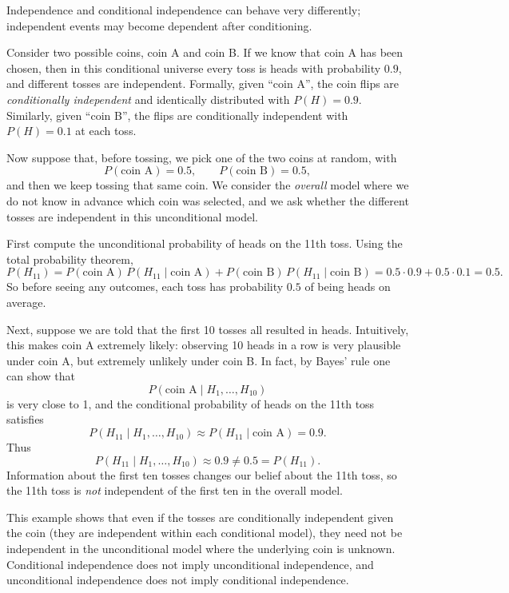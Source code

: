 Independence and conditional independence can behave very differently; independent events may become dependent after conditioning.

Consider two possible coins, coin A and coin B. If we know that coin A has been chosen, then in this conditional universe every toss is heads with probability \(0.9\), and different tosses are independent. Formally, given “coin A”, the coin flips are \textit{conditionally independent} and identically distributed with \(P(H) = 0.9\). Similarly, given “coin B”, the flips are conditionally independent with \(P(H) = 0.1\) at each toss.

Now suppose that, before tossing, we pick one of the two coins at random, with
\[
P(\text{coin A}) = 0.5, \qquad P(\text{coin B}) = 0.5,
\]
and then we keep tossing that same coin. We consider the \textit{overall} model where we do not know in advance which coin was selected, and we ask whether the different tosses are independent in this unconditional model.

First compute the unconditional probability of heads on the 11th toss. Using the total probability theorem,
\[
P(H_{11}) 
= P(\text{coin A})\,P(H_{11} \mid \text{coin A})
+ P(\text{coin B})\,P(H_{11} \mid \text{coin B})
= 0.5 \cdot 0.9 + 0.5 \cdot 0.1 = 0.5.
\]
So before seeing any outcomes, each toss has probability \(0.5\) of being heads on average.

Next, suppose we are told that the first 10 tosses all resulted in heads. Intuitively, this makes coin A extremely likely: observing 10 heads in a row is very plausible under coin A, but extremely unlikely under coin B. In fact, by Bayes’ rule one can show that
\[
P(\text{coin A} \mid H_1, \dots, H_{10})
\]
is very close to 1, and the conditional probability of heads on the 11th toss satisfies
\[
P(H_{11} \mid H_1, \dots, H_{10}) \approx P(H_{11} \mid \text{coin A}) = 0.9.
\]
Thus
\[
P(H_{11} \mid H_1, \dots, H_{10}) \approx 0.9 \neq 0.5 = P(H_{11}).
\]
Information about the first ten tosses changes our belief about the 11th toss, so the 11th toss is \textit{not} independent of the first ten in the overall model.

This example shows that even if the tosses are conditionally independent given the coin (they are independent within each conditional model), they need not be independent in the unconditional model where the underlying coin is unknown. Conditional independence does not imply unconditional independence, and unconditional independence does not imply conditional independence.

